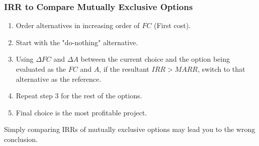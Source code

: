 \subsubsection{IRR to Compare Mutually Exclusive Options}
\begin{process}
    \begin{enumerate}
        \item Order alternatives in increasing order of $FC$ (First cost).
        
        \item Start with the "do-nothing" alternative.
        
        \item Using $\Delta FC$ and $\Delta A$ between the current choice and the option being evaluated as the $FC$ and $A$, if the resultant $IRR > MARR$, switch to that alternative as the reference.
        
        \item Repeat step 3 for the rest of the options.
        
        \item Final choice is the most profitable project.
    \end{enumerate}
\end{process}

\begin{warning}
    Simply comparing IRRs of mutually exclusive options may lead you to the wrong conclusion. 
\end{warning}

\begin{example}
\end{example}